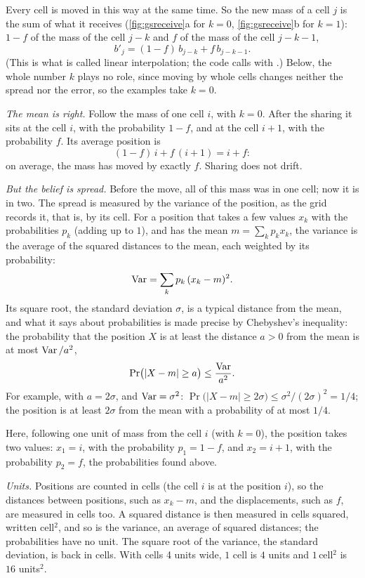 Every cell is moved in this way at the same time. So the new mass of a
cell $j$ is the sum of what it receives (\cref{fig:gsreceive}a for $k=0$,
\cref{fig:gsreceive}b for $k=1$): $1-f$ of the mass of the cell
$j-k$ and $f$ of the mass of the cell $j-k-1$,
\[
  b'_j=(1-f)\,b_{j-k}+f\,b_{j-k-1}.
\]
(This is what is called linear interpolation; the code calls
 with .) Below, the whole number
$k$ plays no role, since moving by whole cells changes neither the
spread nor the error, so the examples take $k=0$.


\emph{The mean is right.} Follow the mass of one cell $i$, with $k=0$.
After the sharing it sits at the cell $i$, with the probability $1-f$,
and at the cell $i+1$, with the probability $f$.
Its average position is
\[
  (1-f)\,i+f\,(i+1)=i+f :
\]
on average, the mass has moved by exactly $f$. Sharing does not drift.

\emph{But the belief is spread.} Before the move, all of this mass was
in one cell; now it is in two. The spread is measured by the variance of
the position, as the grid records it, that is, by its cell. For a
position that takes a few values $x_k$ with the probabilities $p_k$
(adding up to $1$), and has the mean $m=\sum_kp_kx_k$, the variance is the
average of the squared distances to the mean, each weighted by its
probability:
\[
  \operatorname{Var}=\sum_kp_k\,(x_k-m)^2 .
\]
Its square root, the standard deviation $\sigma$, is a typical distance
from the mean, and what it says about probabilities is made precise by
Chebyshev's inequality: the probability that the position $X$ is at
least the distance $a>0$ from the mean is at most $\operatorname{Var}/a^2$,
\[
  \Pr\bigl(|X-m|\ge a\bigr)\le\frac{\operatorname{Var}}{a^2}.
\]
For example, with $a=2\sigma$, and $\operatorname{Var}=\sigma^2$:
$\Pr\bigl(|X-m|\ge2\sigma\bigr)\le\sigma^2/(2\sigma)^2=1/4$; the position
is at least $2\sigma$ from the mean with a probability of at most $1/4$.

Here, following one unit of mass from the cell $i$ (with $k=0$), the
position takes two values: $x_1=i$, with the probability $p_1=1-f$, and
$x_2=i+1$, with the probability $p_2=f$, the probabilities found above.

\emph{Units.} Positions are counted in cells (the cell $i$ is at the
position $i$), so the distances between positions, such as $x_k-m$, and
the displacements, such as $f$, are measured in cells too. A squared
distance is then measured in cells squared, written cell$^2$, and so is
the variance, an average of squared distances; the probabilities have no
unit. The square root of the variance, the standard deviation, is back
in cells. With cells 4 units wide, $1$ cell is $4$ units and
$1$\,cell$^2$ is $16$ units$^2$.

